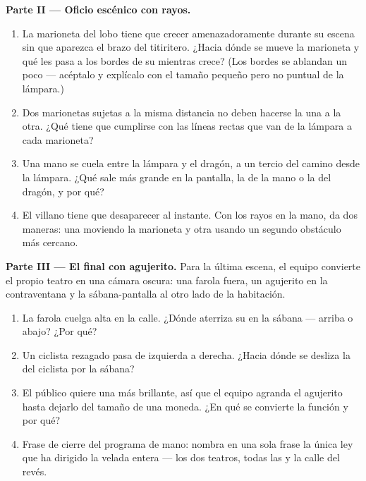 \begin{problem}
\medskip\noindent\textbf{Parte II --- Oficio escénico con rayos.}
\begin{enumerate}[resume]
  \item La marioneta del lobo tiene que crecer amenazadoramente
        durante su escena sin que aparezca el brazo del titiritero.
        ¿Hacia dónde se mueve la marioneta y qué les pasa a los bordes
        de su  mientras crece? (Los bordes se ablandan un
        poco --- acéptalo y explícalo con el tamaño pequeño pero no
        puntual de la lámpara.)
  \item Dos marionetas sujetas a la misma distancia no deben hacerse
         la una a la otra. ¿Qué tiene que cumplirse con las
        líneas rectas que van de la lámpara a cada marioneta?
  \item Una mano se cuela entre la lámpara y el dragón, a un tercio
        del camino desde la lámpara. ¿Qué  sale más grande en
        la pantalla, la de la mano o la del dragón, y por qué?
  \item El villano tiene que desaparecer al instante. Con los rayos
        en la mano, da dos maneras: una moviendo la marioneta y otra
        usando un segundo obstáculo más cercano.
\end{enumerate}

\medskip\noindent\textbf{Parte III --- El final con agujerito.}
Para la última escena, el equipo convierte el propio teatro en una
cámara oscura: una farola fuera, un agujerito en la contraventana y la
sábana-pantalla al otro lado de la habitación.
\begin{enumerate}[resume]
  \item La farola cuelga alta en la calle. ¿Dónde aterriza su
         en la sábana --- arriba o abajo? ¿Por qué?
  \item Un ciclista rezagado pasa de izquierda a derecha. ¿Hacia
        dónde se desliza la  del ciclista por la sábana?
  \item El público quiere una  más brillante, así que el equipo
        agranda el agujerito hasta dejarlo del tamaño de una moneda.
        ¿En qué se convierte la función y por qué?
  \item Frase de cierre del programa de mano: nombra en una sola
        frase la única ley que ha dirigido la velada entera --- los
        dos teatros, todas las  y la calle del revés.
\end{enumerate}
\end{problem}
